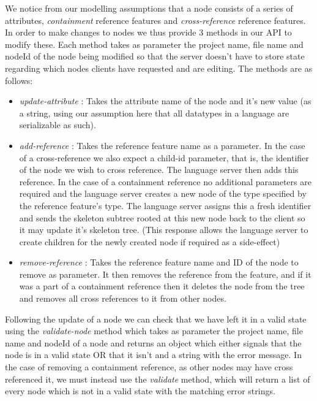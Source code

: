 \documentclass{article}
\begin{document}
We notice from our modelling assumptions that a node consists of a series of attributes, \textit{containment} reference features and \textit{cross-reference} reference features. In order to make changes to nodes we thus provide 3 methods in our API to modify these. Each method takes as parameter the project name, file name and nodeId of the node being modified so that the server doesn't have to store state regarding which nodes clients have requested and are editing. The methods are as follows: 
\begin{itemize}
\item \emph{update-attribute} : Takes the attribute name  of the node and it's new value (as a string, using our assumption here that all datatypes in a language are serializable as such). 
\item \emph{add-reference} : Takes the reference feature name as a parameter. In the case of a cross-reference we also expect a child-id parameter, that is, the identifier of the node we wish to cross reference. The language server then adds this reference. In the case of a containment reference no additional parameters are required and the language server creates a new node of the type specified by the reference feature's type. The language server assigns this a fresh identifier and sends the skeleton subtree rooted at this new node back to the client so it may update it's skeleton tree. (This response allows the language server to create children for the newly created node if required as a side-effect)
\item \emph{remove-reference} : Takes the reference feature name and ID of the node to remove as parameter. It then removes the reference from the feature, and if it was a part of a containment reference then it deletes the node from the tree and removes all cross references to it from other nodes.
\end{itemize} 
Following the update of a node we can check that we have left it in a valid state using the \emph{validate-node} method which takes as parameter the project name, file name and nodeId of a node and returns an object which either signals that the node is in a valid state OR that it isn't and a string with the error message. In the case of removing a containment reference, as other nodes may have cross referenced it, we must instead use the \emph{validate} method, which will return a list of every node which is not in a valid state with the matching error strings.
\end{document}
